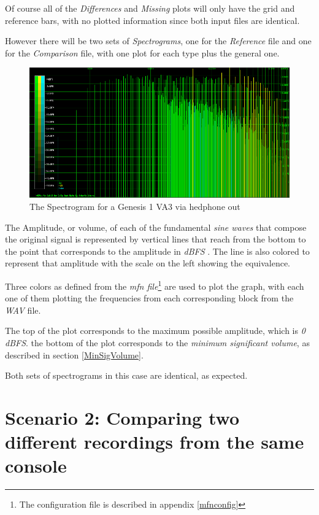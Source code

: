 \documentclass[10pt,a4paper]{report}
\begin{document}
Of course all of the \textit{Differences} and \textit{Missing} plots will only have the grid and reference bars, with no plotted information since both input files are identical. 

However there will be two sets of \textit{Spectrograms}, one for the \textit{Reference} file and one for the \textit{Comparison} file, with one plot for each type plus the general one.

\begin{figure}[H]
	\centering
	\includegraphics[width=1.0\linewidth]{plots/Plot2-SameFile-FM-Spectrogram.png}
	\caption[Spectrogram]{The Spectrogram for a Genesis 1 VA3 via hedphone out}
	\label{fig:plot2-samefile-fm-spectrogram}
\end{figure}

The Amplitude, or volume, of each of the fundamental \textit{sine waves} that compose the original signal is represented by vertical lines that reach from the bottom to the point that corresponds to the amplitude in \textit{dBFS} \cite{dbfs}. The line is also colored to represent that amplitude with the scale on the left showing the equivalence.

Three colors as defined from the \textit{mfn file}\footnote{The configuration file is described in appendix \ref{mfnconfig}} are used to plot the graph, with each one of them plotting the frequencies from each corresponding block from the \textit{WAV} file.

The top of the plot corresponds to the maximum possible amplitude, which is \textit{0 dBFS}. the bottom of the plot corresponds to the \textit{minimum significant volume}, as described in section \ref{MinSigVolume}.

Both sets of spectrograms in this case are identical, as expected. 

\section{Scenario 2: Comparing two different recordings from the same console}
\end{document}
